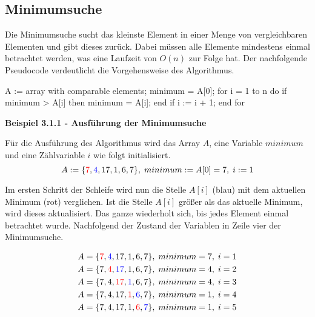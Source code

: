 \subsection{Minimumsuche}

Die Minimumsuche sucht das kleinste Element in einer Menge von vergleichbaren Elementen und gibt dieses zurück. Dabei müssen alle Elemente mindestens einmal betrachtet werden, was eine Laufzeit von $O(n)$ zur Folge hat. Der nachfolgende Pseudocode verdeutlicht die Vorgehensweise des Algorithmus.

\begin{PseudoCode}
A := array with comparable elements;
minimum = A[0];
for i = 1 to n do
	if minimum > A[i] then
		minimum = A[i];
	end if
	i := i + 1;
end for
\end{PseudoCode}

\noindent
\textbf{Beispiel 3.1.1 - Ausführung der Minimumsuche}

\noindent
Für die Ausführung des Algorithmus wird das Array $A$, eine Variable $minimum$ und eine Zählvariable $i$ wie folgt initialisiert. 
\begin{equation*}
	A := \{\textcolor{red}{7}, \textcolor{blue}{4}, 17, 1, 6, 7\},\;minimum := A[0] = 7,\;i := 1
\end{equation*}

\noindent
Im ersten Schritt der Schleife wird nun die Stelle $A[i]$ (blau) mit dem aktuellen Minimum (rot) verglichen. Ist die Stelle $A[i]$ größer als das aktuelle Minimum, wird dieses aktualisiert. Das ganze wiederholt sich, bis jedes Element einmal betrachtet wurde. Nachfolgend der Zustand der Variablen in Zeile vier der Minimumsuche.

\begin{equation*}
	\begin{split}
		A = \{\textcolor{red}{7}, \textcolor{blue}{4}, 17, 1, 6, 7\},\;minimum = 7,\;i = 1 \\
		A = \{7, \textcolor{red}{4}, \textcolor{blue}{17}, 1, 6, 7\},\;minimum = 4,\;i = 2 \\
		A = \{7, 4, \textcolor{red}{17}, \textcolor{blue}{1}, 6, 7\},\;minimum = 4,\;i = 3 \\
		A = \{7, 4, 17, \textcolor{red}{1}, \textcolor{blue}{6}, 7\},\;minimum = 1,\;i = 4 \\
		A = \{7, 4, 17, 1, \textcolor{red}{6}, \textcolor{blue}{7}\},\;minimum = 1,\;i = 5 
	\end{split}
\end{equation*}

\newpage





